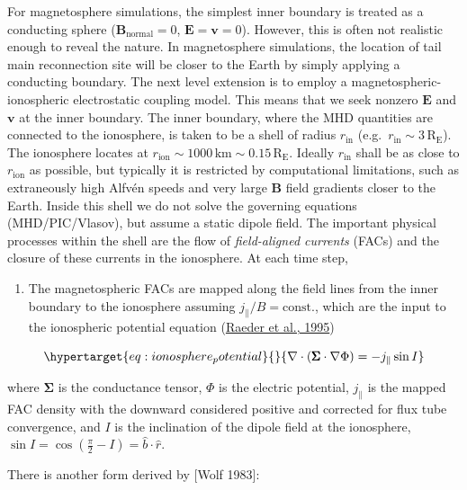 \documentclass[
  notoc %
]{tufte-book}
\providecommand{\tightlist}{%
  \setlength{\itemsep}{0pt}\setlength{\parskip}{0pt}
}
\begin{document}
For magnetosphere simulations, the simplest inner boundary is treated as
a conducting sphere (\(\mathbf{B}_\text{normal}=0\),
\(\mathbf{E}=\mathbf{v}=0\)). However, this is often not realistic
enough to reveal the nature. In magnetosphere simulations, the location
of tail main reconnection site will be closer to the Earth by simply
applying a conducting boundary. The next level extension is to employ a
magnetospheric-ionospheric electrostatic coupling model. This means that
we seek nonzero \(\mathbf{E}\) and \(\mathbf{v}\) at the inner boundary.
The inner boundary, where the MHD quantities are connected to the
ionosphere, is taken to be a shell of radius \(r_\text{in}\)
(e.g.~\(r_\text{in}\sim 3\,\text{R}_\text{E}\)). The ionosphere locates
at \(r_\text{ion}\sim 1000\,\text{km}\sim 0.15\,\text{R}_\text{E}\).
Ideally \(r_\text{in}\) shall be as close to \(r_\text{ion}\) as
possible, but typically it is restricted by computational limitations,
such as extraneously high Alfvén speeds and very large \(\mathbf{B}\)
field gradients closer to the Earth. Inside this shell we do not solve
the governing equations (MHD/PIC/Vlasov), but assume a static dipole
field. The important physical processes within the shell are the flow of
\emph{field-aligned currents} (FACs) and the closure of these currents
in the ionosphere. At each time step,

\begin{enumerate}
\def\labelenumi{\arabic{enumi}.}
\tightlist
\item
  The magnetospheric FACs are mapped along the field lines from the
  inner boundary to the ionosphere assuming
  \(j_\parallel/B=\text{const.}\), which are the input to the
  ionospheric potential equation
  (\protect\hyperlink{ref-raeder1995}{Raeder et al., 1995})
\end{enumerate}

\begin{equation}\protect\hypertarget{eq:ionosphere_potential}{}{
\nabla\cdot(\pmb{\Sigma}\cdot\nabla\Phi) = -j_\parallel\sin I
}\label{eq:ionosphere_potential}\end{equation}

where \(\pmb{\Sigma}\) is the conductance tensor, \(\Phi\) is the
electric potential, \(j_\parallel\) is the mapped FAC density with the
downward considered positive and corrected for flux tube convergence,
and \(I\) is the inclination of the dipole field at the ionosphere,
\(\sin I=\cos(\frac{\pi}{2}-I)=\hat{b}\cdot\hat{r}\).

There is another form derived by {[}Wolf 1983{]}:
\end{document}

